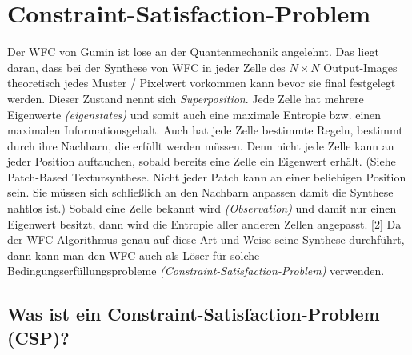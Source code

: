 \documentclass[12pt]{report}
\begin{document}
\section{Constraint-Satisfaction-Problem}

Der WFC von Gumin ist lose an der Quantenmechanik angelehnt.
Das liegt daran, dass bei der Synthese von WFC in jeder Zelle des $N\times N$ Output-Images theoretisch jedes Muster / Pixelwert vorkommen kann bevor sie final festgelegt werden.
Dieser Zustand nennt sich \textit{Superposition}.
Jede Zelle hat mehrere Eigenwerte \textit{(eigenstates)} und somit auch eine maximale Entropie bzw. einen maximalen Informationsgehalt.
Auch hat jede Zelle bestimmte Regeln, bestimmt durch ihre Nachbarn, die erfüllt werden müssen.
Denn nicht jede Zelle kann an jeder Position auftauchen, sobald bereits eine Zelle ein Eigenwert erhält.
{(Siehe Patch-Based Textursynthese. Nicht jeder Patch kann an einer beliebigen Position sein.
Sie müssen sich schließlich an den Nachbarn anpassen damit die Synthese nahtlos ist.)}
Sobald eine Zelle bekannt wird \textit{(Observation)} und damit nur einen Eigenwert besitzt,
dann wird die Entropie aller anderen Zellen angepasst. {[2]}
Da der WFC Algorithmus genau auf diese Art und Weise seine Synthese durchführt,
dann kann man den WFC auch als Löser für solche Bedingungserfüllungsprobleme \textit{(Constraint-Satisfaction-Problem)} verwenden.

\subsection{Was ist ein Constraint-Satisfaction-Problem {(CSP)}?}
\end{document}
